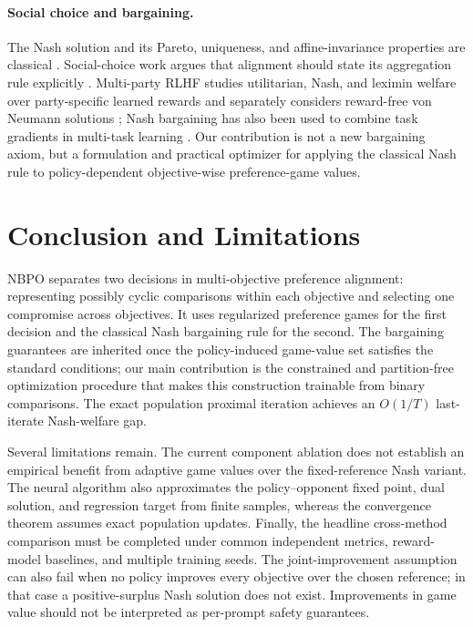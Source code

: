 \documentclass{article}
\theoremstyle{remark}
\theoremstyle{plain}
\newcommand{\NBPO}{\textsc{NBPO}}
\begin{document}
\paragraph{Social choice and bargaining.}
The Nash solution and its Pareto, uniqueness, and affine-invariance properties are classical \citep{nash1950}. Social-choice work argues that alignment should state its aggregation rule explicitly \citep{conitzer2024social}. Multi-party RLHF studies utilitarian, Nash, and leximin welfare over party-specific learned rewards and separately considers reward-free von Neumann solutions \citep{zhong2024nashwelfare}; Nash bargaining has also been used to combine task gradients in multi-task learning \citep{navon2022nashmtl}. Our contribution is not a new bargaining axiom, but a formulation and practical optimizer for applying the classical Nash rule to policy-dependent objective-wise preference-game values.

\section{Conclusion and Limitations}
\label{sec:conclusion}
\NBPO{} separates two decisions in multi-objective preference alignment: representing possibly cyclic comparisons within each objective and selecting one compromise across objectives. It uses regularized preference games for the first decision and the classical Nash bargaining rule for the second. The bargaining guarantees are inherited once the policy-induced game-value set satisfies the standard conditions; our main contribution is the constrained and partition-free optimization procedure that makes this construction trainable from binary comparisons. The exact population proximal iteration achieves an $O(1/T)$ last-iterate Nash-welfare gap.

Several limitations remain. The current component ablation does not establish an empirical benefit from adaptive game values over the fixed-reference Nash variant. The neural algorithm also approximates the policy--opponent fixed point, dual solution, and regression target from finite samples, whereas the convergence theorem assumes exact population updates. Finally, the headline cross-method comparison must be completed under common independent metrics, reward-model baselines, and multiple training seeds. The joint-improvement assumption can also fail when no policy improves every objective over the chosen reference; in that case a positive-surplus Nash solution does not exist. Improvements in game value should not be interpreted as per-prompt safety guarantees.
\end{document}
